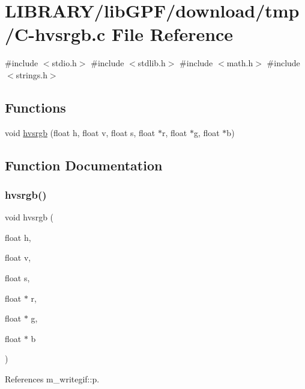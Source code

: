 \hypertarget{C-hvsrgb_8c}{}\section{L\+I\+B\+R\+A\+R\+Y/lib\+G\+P\+F/download/tmp/\+C-\/hvsrgb.c File Reference}
\label{C-hvsrgb_8c}
{\ttfamily \#include $<$stdio.\+h$>$}\newline
{\ttfamily \#include $<$stdlib.\+h$>$}\newline
{\ttfamily \#include $<$math.\+h$>$}\newline
{\ttfamily \#include $<$strings.\+h$>$}\newline
\subsection*{Functions}
\begin{DoxyCompactItemize}
\item 
void \hyperlink{C-hvsrgb_8c_a3e696875abb711e0bda0e666bf6828e3}{hvsrgb} (float h, float v, float s, float $\ast$r, float $\ast$g, float $\ast$b)
\end{DoxyCompactItemize}


\subsection{Function Documentation}
\mbox{\label{C-hvsrgb_8c_a3e696875abb711e0bda0e666bf6828e3}} 
\subsubsection{\texorpdfstring{hvsrgb()}{hvsrgb()}}
{\footnotesize\ttfamily void hvsrgb (\begin{DoxyParamCaption}\item[{float}]{h,  }\item[{float}]{v,  }\item[{float}]{s,  }\item[{float $\ast$}]{r,  }\item[{float $\ast$}]{g,  }\item[{float $\ast$}]{b }\end{DoxyParamCaption})}



References m\+\_\+writegif\+::p.

